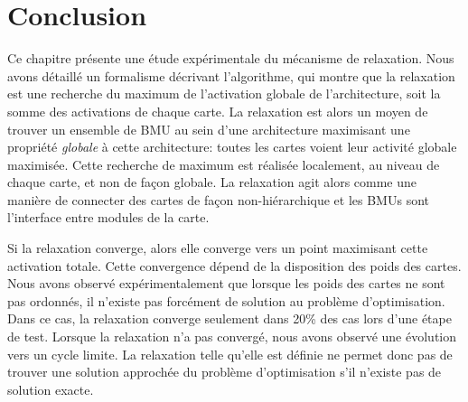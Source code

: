 \documentclass[../main]{subfiles}
\begin{document}

%



\section{Conclusion}

Ce chapitre présente une étude expérimentale du mécanisme de relaxation. Nous avons détaillé un formalisme décrivant l'algorithme, qui montre que la relaxation est une recherche du maximum de l'activation globale de l'architecture, soit la somme des activations de chaque carte.
La relaxation est alors un moyen de trouver un ensemble de BMU au sein d'une architecture maximisant une propriété \emph{globale} à cette architecture: toutes les cartes voient leur activité globale maximisée. 
Cette recherche de maximum est réalisée localement, au niveau de chaque carte, et non de façon globale. La relaxation agit alors comme une manière de connecter des cartes de façon non-hiérarchique et les BMUs sont 
l'interface entre modules de la carte.


Si la relaxation converge, alors elle converge vers un point maximisant cette activation totale.
Cette convergence dépend de la disposition des poids des cartes.
Nous avons observé expérimentalement que lorsque les poids des cartes ne sont pas ordonnés, il n'existe pas forcément de solution au problème d'optimisation. Dans ce cas, la relaxation converge seulement dans 20\% des cas lors d'une étape de test. Lorsque la relaxation n'a pas convergé, nous avons observé une évolution vers un cycle limite. La relaxation telle qu'elle est définie ne permet donc pas de trouver une solution approchée du problème d'optimisation s'il n'existe pas de solution exacte.
\end{document}
